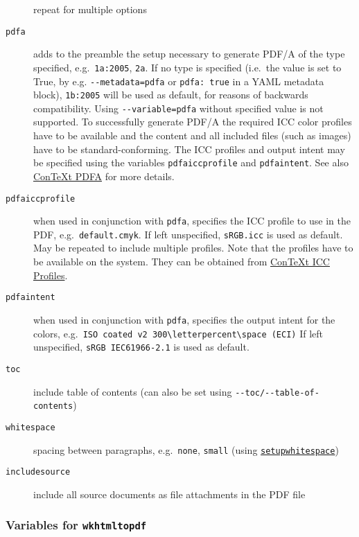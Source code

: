 \documentclass[
]{article}
\begin{document}
\begin{description}
repeat for multiple options
\item[\texttt{pdfa}]
adds to the preamble the setup necessary to generate PDF/A of the type
specified, e.g.~\texttt{1a:2005}, \texttt{2a}. If no type is specified
(i.e.~the value is set to True, by e.g. \texttt{-\/-metadata=pdfa} or
\texttt{pdfa:\ true} in a YAML metadata block), \texttt{1b:2005} will be
used as default, for reasons of backwards compatibility. Using
\texttt{-\/-variable=pdfa} without specified value is not supported. To
successfully generate PDF/A the required ICC color profiles have to be
available and the content and all included files (such as images) have
to be standard-conforming. The ICC profiles and output intent may be
specified using the variables \texttt{pdfaiccprofile} and
\texttt{pdfaintent}. See also
\href{https://wiki.contextgarden.net/PDF/A}{ConTeXt PDFA} for more
details.
\item[\texttt{pdfaiccprofile}]
when used in conjunction with \texttt{pdfa}, specifies the ICC profile
to use in the PDF, e.g.~\texttt{default.cmyk}. If left unspecified,
\texttt{sRGB.icc} is used as default. May be repeated to include
multiple profiles. Note that the profiles have to be available on the
system. They can be obtained from
\href{https://wiki.contextgarden.net/PDFX\#ICC_profiles}{ConTeXt ICC
Profiles}.
\item[\texttt{pdfaintent}]
when used in conjunction with \texttt{pdfa}, specifies the output intent
for the colors,
e.g.~\texttt{ISO\ coated\ v2\ 300\textbackslash{}letterpercent\textbackslash{}space\ (ECI)}
If left unspecified, \texttt{sRGB\ IEC61966-2.1} is used as default.
\item[\texttt{toc}]
include table of contents (can also be set using
\texttt{-\/-toc/-\/-table-of-contents})
\item[\texttt{whitespace}]
spacing between paragraphs, e.g.~\texttt{none}, \texttt{small} (using
\href{https://wiki.contextgarden.net/Command/setupwhitespace}{\texttt{setupwhitespace}})
\item[\texttt{includesource}]
include all source documents as file attachments in the PDF file
\end{description}

\hypertarget{variables-for-wkhtmltopdf}{%
\subsubsection{\texorpdfstring{Variables for
\texttt{wkhtmltopdf}}{Variables for wkhtmltopdf}}\label{variables-for-wkhtmltopdf}}
\end{document}
